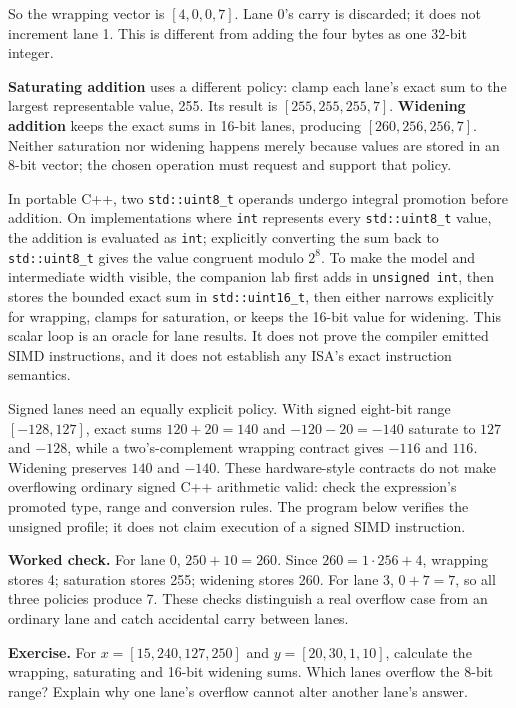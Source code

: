 So the wrapping vector is \([4,0,0,7]\). Lane 0's carry is discarded; it does not increment lane 1. This is different from adding the four bytes as one 32-bit integer.

\textbf{Saturating addition} uses a different policy: clamp each lane's exact sum to the largest representable value, 255. Its result is \([255,255,255,7]\). \textbf{Widening addition} keeps the exact sums in 16-bit lanes, producing \([260,256,256,7]\). Neither saturation nor widening happens merely because values are stored in an 8-bit vector; the chosen operation must request and support that policy.

In portable C++, two \texttt{std::uint8\_t} operands undergo integral promotion before addition. On implementations where \texttt{int} represents every \texttt{std::uint8\_t} value, the addition is evaluated as \texttt{int}; explicitly converting the sum back to \texttt{std::uint8\_t} gives the value congruent modulo \(2^8\). To make the model and intermediate width visible, the companion lab first adds in \texttt{unsigned\ int}, then stores the bounded exact sum in \texttt{std::uint16\_t}, then either narrows explicitly for wrapping, clamps for saturation, or keeps the 16-bit value for widening. This scalar loop is an oracle for lane results. It does not prove the compiler emitted SIMD instructions, and it does not establish any ISA's exact instruction semantics.

Signed lanes need an equally explicit policy. With signed eight-bit range \([-128,127]\), exact sums \(120+20=140\) and \(-120-20=-140\) saturate to \(127\) and \(-128\), while a two's-complement wrapping contract gives \(-116\) and \(116\). Widening preserves \(140\) and \(-140\). These hardware-style contracts do not make overflowing ordinary signed C++ arithmetic valid: check the expression's promoted type, range and conversion rules. The program below verifies the unsigned profile; it does not claim execution of a signed SIMD instruction.

\textbf{Worked check.} For lane 0, \(250+10=260\). Since \(260=1\cdot256+4\), wrapping stores 4; saturation stores 255; widening stores 260. For lane 3, \(0+7=7\), so all three policies produce 7. These checks distinguish a real overflow case from an ordinary lane and catch accidental carry between lanes.

\textbf{Exercise.} For \(x=[15,240,127,250]\) and \(y=[20,30,1,10]\), calculate the wrapping, saturating and 16-bit widening sums. Which lanes overflow the 8-bit range? Explain why one lane's overflow cannot alter another lane's answer.

